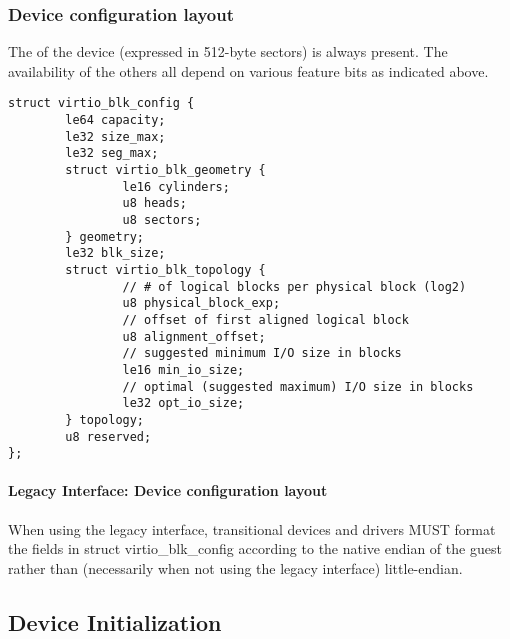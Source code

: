 \subsubsection{Device configuration layout}\label{sec:Device Types / Block Device / Feature bits / Device configuration layout}

The  of the device (expressed in 512-byte sectors) is always
present. The availability of the others all depend on various feature
bits as indicated above.

\begin{lstlisting}
struct virtio_blk_config {
        le64 capacity;
        le32 size_max;
        le32 seg_max;
        struct virtio_blk_geometry {
                le16 cylinders;
                u8 heads;
                u8 sectors;
        } geometry;
        le32 blk_size;
        struct virtio_blk_topology {
                // # of logical blocks per physical block (log2)
                u8 physical_block_exp;
                // offset of first aligned logical block
                u8 alignment_offset;
                // suggested minimum I/O size in blocks
                le16 min_io_size;
                // optimal (suggested maximum) I/O size in blocks
                le32 opt_io_size;
        } topology;
        u8 reserved;
};
\end{lstlisting}


\paragraph{Legacy Interface: Device configuration layout}\label{sec:Device Types / Block Device / Feature bits / Device configuration layout / Legacy Interface: Device configuration layout}
When using the legacy interface, transitional devices and drivers
MUST format the fields in struct virtio_blk_config
according to the native endian of the guest rather than
(necessarily when not using the legacy interface) little-endian.


\subsection{Device Initialization}\label{sec:Device Types / Block Device / Device Initialization}

